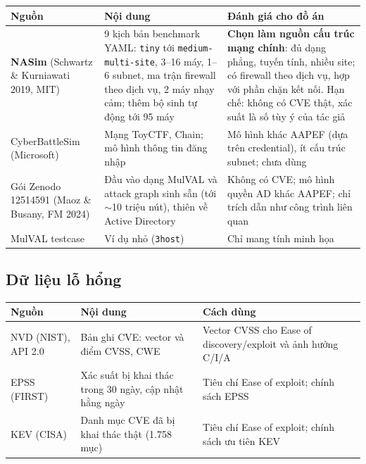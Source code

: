\documentclass[11pt,a4paper]{article}
\begin{document}
\begin{center}
\small
\begin{tabular}{@{}Y{3.0cm}Y{6.2cm}Y{6.6cm}@{}}
\toprule
\textbf{Nguồn} & \textbf{Nội dung} & \textbf{Đánh giá cho đồ án} \\
\midrule
\textbf{NASim} (Schwartz \& Kurniawati 2019, MIT) & 9 kịch bản benchmark YAML: \texttt{tiny} tới \texttt{medium-multi-site}, 3--16 máy, 1--6 subnet, ma trận firewall theo dịch vụ, 2 máy nhạy cảm; thêm bộ sinh tự động tới 95 máy & \textbf{Chọn làm nguồn cấu trúc mạng chính}: đủ dạng phẳng, tuyến tính, nhiều site; có firewall theo dịch vụ, hợp với phần chặn kết nối. Hạn chế: không có CVE thật, xác suất là số tùy ý của tác giả \\
CyberBattleSim (Microsoft) & Mạng ToyCTF, Chain; mô hình thông tin đăng nhập & Mô hình khác AAPEF (dựa trên credential), ít cấu trúc subnet; chưa dùng \\
Gói Zenodo 12514591 (Maoz \& Busany, FM 2024) & Đầu vào dạng MulVAL và attack graph sinh sẵn (tới $\sim$10 triệu nút), thiên về Active Directory & Không có CVE; mô hình quyền AD khác AAPEF; chỉ trích dẫn như công trình liên quan \\
MulVAL testcase & Ví dụ nhỏ (\texttt{3host}) & Chỉ mang tính minh họa \\
\bottomrule
\end{tabular}
\end{center}

\subsection{Dữ liệu lỗ hổng}

\begin{center}
\small
\begin{tabular}{@{}Y{3.0cm}Y{6.2cm}Y{6.6cm}@{}}
\toprule
\textbf{Nguồn} & \textbf{Nội dung} & \textbf{Cách dùng} \\
\midrule
NVD (NIST), API 2.0 & Bản ghi CVE: vector và điểm CVSS, CWE & Vector CVSS cho Ease of discovery/exploit và ảnh hưởng C/I/A \\
EPSS (FIRST) & Xác suất bị khai thác trong 30 ngày, cập nhật hằng ngày & Tiêu chí Ease of exploit; chính sách EPSS \\
KEV (CISA) & Danh mục CVE đã bị khai thác thật (1.758 mục) & Tiêu chí Ease of exploit; chính sách ưu tiên KEV \\
\bottomrule
\end{tabular}
\end{center}
\end{document}
